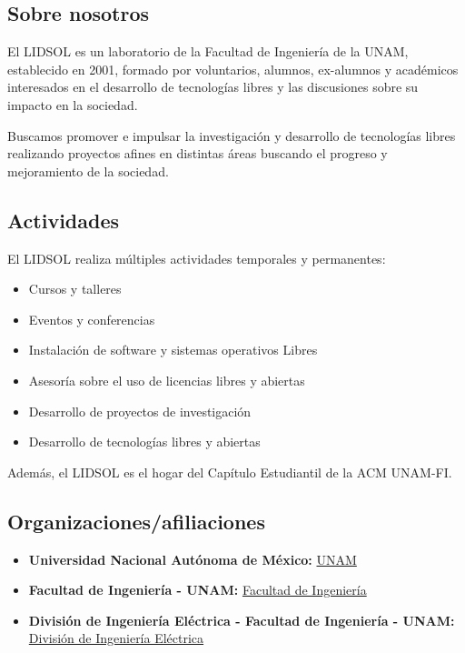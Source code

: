 \documentclass[12pt]{article}
\begin{document}
\subsection{Sobre nosotros}
El LIDSOL es un laboratorio de la Facultad de Ingeniería de la UNAM, establecido en 2001, formado por voluntarios, alumnos, ex-alumnos y académicos interesados en el desarrollo de tecnologías libres y las discusiones sobre su impacto en la sociedad.

Buscamos promover e impulsar la investigación y desarrollo de tecnologías libres realizando proyectos afines en distintas áreas buscando el progreso y mejoramiento de la sociedad.

\subsection{Actividades}
El LIDSOL realiza múltiples actividades temporales y permanentes:
\begin{itemize}[label=--]
    \item Cursos y talleres
    \item Eventos y conferencias
    \item Instalación de software y sistemas operativos Libres
    \item Asesoría sobre el uso de licencias libres y abiertas
    \item Desarrollo de proyectos de investigación
    \item Desarrollo de tecnologías libres y abiertas
\end{itemize}

Además, el LIDSOL es el hogar del Capítulo Estudiantil de la ACM UNAM-FI.

\subsection{Organizaciones/afiliaciones}
\begin{itemize}[label=--]
    \item \textbf{Universidad Nacional Autónoma de México:} \href{http://www.unam.mx/}{UNAM}
    \item \textbf{Facultad de Ingeniería - UNAM:} \href{http://www.ingenieria.unam.mx/}{Facultad de Ingeniería}
    \item \textbf{División de Ingeniería Eléctrica - Facultad de Ingeniería - UNAM:} \href{http://www.fi-b.unam.mx/}{División de Ingeniería Eléctrica}
\end{itemize}
\end{document}
